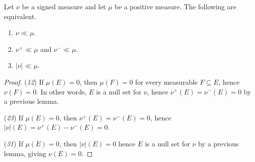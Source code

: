 \documentclass[11pt]{article}
\theoremstyle{definition}
\theoremstyle{remark}
\begin{document}
    \begin{lemma}
        Let $\nu$ be a signed measure and let $\mu$ be a positive measure. The
        following are equivalent. \begin{enumerate}
            \item $\nu \ll \mu$.
            \item $\nu^+ \ll \mu$ and $\nu^- \ll \mu$.
            \item $|\nu| \ll \mu$.
        \end{enumerate}
    \end{lemma}
    \begin{proof}
        (\emph{1}\Rightarrow \emph{2}) If $\mu(E) = 0$, then $\mu(F) = 0$ for every
        measurable $F \subseteq E$, hence $\nu(F) = 0$. In other words, $E$ is a null
        set for $\nu$, hence $\nu^+(E) = \nu^-(E) = 0$ by a previous lemma.


        (\emph{2}\Rightarrow \emph{3}) If $\mu(E) = 0$, then $\nu^+(E) = \nu^-(E) =
        0$, hence $|\nu|(E) = \nu^+(E) - \nu^-(E) = 0$.

        (\emph{3}\Rightarrow \emph{1}) If $\mu(E) = 0$, then $|\nu|(E) = 0$ hence $E$
        is a null set for $\nu$ by a previous lemma, giving $\nu(E) = 0$.
    \end{proof}
\end{document}
